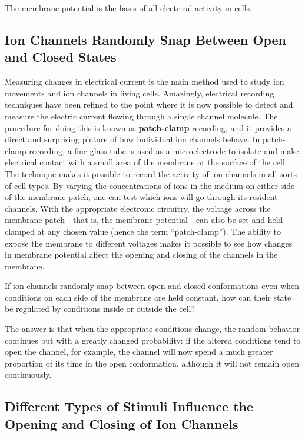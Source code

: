 The membrane potential is the basis of all electrical activity in cells.

\subsection{Ion Channels Randomly Snap Between Open and Closed States}

Measuring changes in electrical current is the main method used to study
ion movements and ion channels in living cells. Amazingly, electrical
recording techniques have been refined to the point where it is now possible
to detect and measure the electric current flowing through a single
channel molecule. The procedure for doing this is known as \textbf{patch-clamp}
recording, and it provides a direct and surprising picture of how individual
ion channels behave.
In patch-clamp recording, a fine glass tube is used as a microelectrode to
isolate and make electrical contact with a small area of the membrane
at the surface of the cell. The technique makes it possible
to record the activity of ion channels in all sorts of cell types.
By varying the concentrations of ions in
the medium on either side of the membrane patch, one can test which
ions will go through its resident channels. With the appropriate electronic
circuitry, the voltage across the membrane patch - that is, the membrane
potential - can also be set and held clamped at any chosen value (hence
the term “patch-clamp”). The ability to expose the membrane to different
voltages makes it possible to see how changes in membrane potential
affect the opening and closing of the channels in the membrane.

If ion channels randomly snap between open and closed conformations
even when conditions on each side of the membrane are held constant,
how can their state be regulated by conditions inside or outside the cell?

The answer is that when the appropriate conditions change, the random
behavior continues but with a greatly changed probability: if the altered
conditions tend to open the channel, for example, the channel will now
spend a much greater proportion of its time in the open conformation,
although it will not remain open continuously.

\subsection{Different Types of Stimuli Influence the Opening and Closing of Ion Channels}

